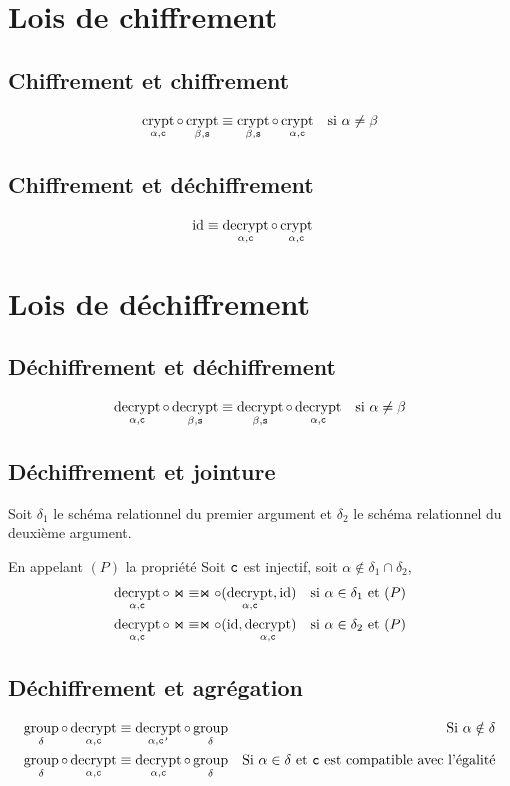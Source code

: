 \documentclass[french]{article}
\DeclareMathOperator{\crypt}{crypt}
\DeclareMathOperator{\decrypt}{decrypt}
\DeclareMathOperator{\group}{group}
\DeclareMathOperator{\id}{id}
\newcommand\typeT[1]{\text{\ttfamily #1}}
\newcommand{\decryptArgs}[2]{\decrypt_{#1 , \typeT{#2}}}
\newcommand{\cryptArgs}[2]{\crypt_{#1 , \typeT{#2}}}
\newcommand{\decryptCAlpha}{\decryptArgs{\alpha}{c}}
\newcommand{\cryptCAlpha}{\cryptArgs{\alpha}{c}}
\newcommand{\ch}{\typeT{c}}
\newcommand{\chp}{\typeT{c'}}
\newcommand{\groupDelta}{\group_{\delta}}
\newcommand{\args}{Soit $\delta_1$ le schéma relationnel du premier
	argument et $\delta_2$ le schéma relationnel du deuxième
	argument.}
\begin{document}
\section*{Lois de chiffrement}
\subsection*{Chiffrement et chiffrement}
\begin{align}
\cryptCAlpha \circ \cryptArgs{\beta}{s}
& \equiv \cryptArgs{\beta}{s} \circ \cryptCAlpha
& \text{si $\alpha \neq \beta$}
\end{align}

\subsection*{Chiffrement et déchiffrement}
\begin{align}
\id & \equiv \decryptArgs{\alpha}{c} \circ \cryptArgs{\alpha}{c}
\end{align}

\section*{Lois de déchiffrement}
\subsection*{Déchiffrement et déchiffrement}
\begin{align}
\decryptCAlpha \circ \decryptArgs{\beta}{s}
& \equiv \decryptArgs{\beta}{s} \circ \decryptCAlpha
& \text{si $\alpha \neq \beta$}
\end{align}

\subsection*{Déchiffrement et jointure}
\args

En appelant $(P)$ la propriété
\og Soit $\ch$ est injectif, soit $\alpha \notin \delta_1 \cap \delta_2$\fg{},
\begin{align}
\decryptCAlpha \circ \Join
& \equiv
\Join \circ (\decryptCAlpha, \id)
& \text{si $\alpha \in \delta_1$ et $(P)$} \\
\decryptCAlpha \circ \Join
& \equiv
\Join \circ (\id, \decryptCAlpha)
& \text{si $\alpha \in \delta_2$ et $(P)$} 
\end{align}

\subsection*{Déchiffrement et agrégation}
\begin{align}
\groupDelta \circ \decryptCAlpha
& \equiv \decryptArgs{\alpha}{\chp} \circ \groupDelta
& \text{Si $\alpha \notin \delta$} \\
\groupDelta \circ \decryptCAlpha
& \equiv \decryptCAlpha \circ \groupDelta
& \text{Si $\alpha \in \delta$ et $\ch$ est compatible avec l'égalité}
\end{align}
\end{document}
